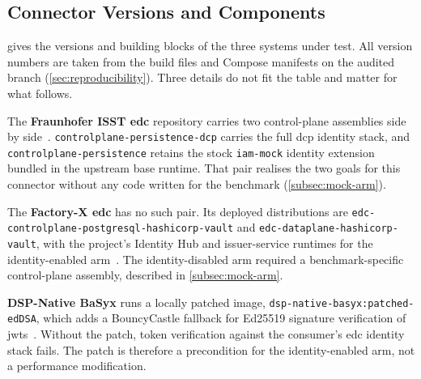 \subsection{Connector Versions and Components}\label{subsec:connector-versions}

 gives the versions and building blocks of the three systems
under test. All version numbers are taken from the build files and Compose manifests on the
audited branch (\cref{sec:reproducibility}). Three details do not fit the table and matter
for what follows.

The \textbf{Fraunhofer ISST \gls{edc}} repository carries two control-plane assemblies side
by side~\citep{fraunhoferIsstDst}. \texttt{controlplane-persistence-dcp} carries the full
\gls{dcp} identity stack, and \texttt{controlplane-persistence} retains the stock
\texttt{iam-mock} identity extension bundled in the upstream base runtime. That pair
realises the two goals for this connector without any code written for the benchmark
(\cref{subsec:mock-arm}).

The \textbf{Factory-X \gls{edc}} has no such pair. Its deployed distributions are
\texttt{edc-controlplane-\allowbreak postgresql-\allowbreak hashicorp-\allowbreak vault}
and \texttt{edc-dataplane-\allowbreak hashicorp-\allowbreak vault}, with the project's
Identity Hub and issuer-service runtimes for the identity-enabled
arm~\citep{factoryxEdc}. The identity-disabled arm required a benchmark-specific
control-plane assembly, described in \cref{subsec:mock-arm}.

\textbf{DSP-Native BaSyx} runs a locally patched image,
\texttt{dsp-native-\allowbreak basyx:\allowbreak patched-edDSA}, which adds a BouncyCastle fallback for Ed25519
signature verification of \glspl{jwt}~\citep{dspNativeBasyx}. Without the patch, token
verification against the consumer's \gls{edc} identity stack fails. The patch is therefore
a precondition for the identity-enabled arm, not a performance modification.

